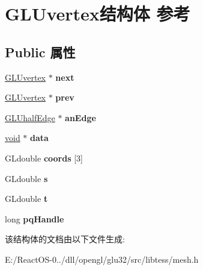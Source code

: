 \hypertarget{struct_g_l_uvertex}{}\section{G\+L\+Uvertex结构体 参考}
\label{struct_g_l_uvertex}
\subsection*{Public 属性}
\begin{DoxyCompactItemize}
\item 
\mbox{\label{struct_g_l_uvertex_ac9e77487a441f8ef3ce79376c1953402}} 
\hyperlink{struct_g_l_uvertex}{G\+L\+Uvertex} $\ast$ {\bfseries next}
\item 
\mbox{\label{struct_g_l_uvertex_af3a3de60e55a862ac371e7bfb0fe0d4e}} 
\hyperlink{struct_g_l_uvertex}{G\+L\+Uvertex} $\ast$ {\bfseries prev}
\item 
\mbox{\label{struct_g_l_uvertex_a0247062c8781dfa81118e776c4e2bc74}} 
\hyperlink{struct_g_l_uhalf_edge}{G\+L\+Uhalf\+Edge} $\ast$ {\bfseries an\+Edge}
\item 
\mbox{\label{struct_g_l_uvertex_aee876f917b23ea362253513e573c0c70}} 
\hyperlink{interfacevoid}{void} $\ast$ {\bfseries data}
\item 
\mbox{\label{struct_g_l_uvertex_a94f51dfac2c87152b263bd6b7b3fddfc}} 
G\+Ldouble {\bfseries coords} \mbox{[}3\mbox{]}
\item 
\mbox{\label{struct_g_l_uvertex_aa5fb0375c6342e2128755cdb741aaadf}} 
G\+Ldouble {\bfseries s}
\item 
\mbox{\label{struct_g_l_uvertex_a1ea31626c6d3c0a17f47f66f89cb9ac7}} 
G\+Ldouble {\bfseries t}
\item 
\mbox{\label{struct_g_l_uvertex_ae09c1691b43f48a6f8ad86b8c4244355}} 
long {\bfseries pq\+Handle}
\end{DoxyCompactItemize}


该结构体的文档由以下文件生成\+:\begin{DoxyCompactItemize}
\item 
E\+:/\+React\+O\+S-\/0../dll/opengl/glu32/src/libtess/mesh.\+h\end{DoxyCompactItemize}
